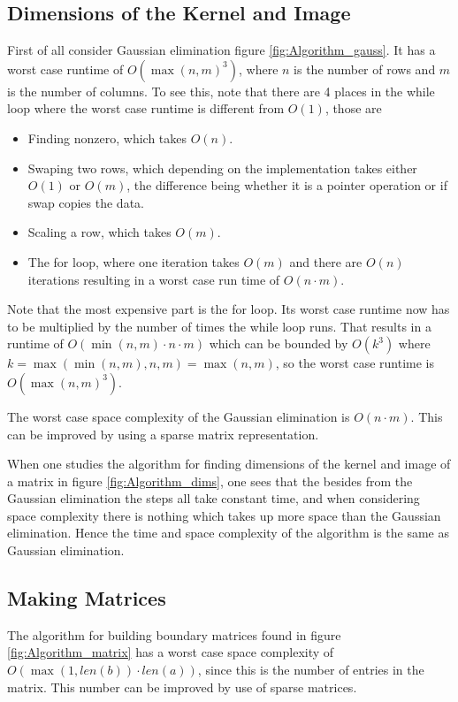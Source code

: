 \documentclass[11pt,a4paper,twoside]{report}
\begin{document}
\subsection{Dimensions of the Kernel and Image}
First of all consider Gaussian elimination figure \ref{fig:Algorithm_gauss}. It has a worst case runtime of $O(\max(n,m)^3)$, where $n$ is the number of rows and $m$ is the number of columns. To see this, note that there are 4 places in the while loop where the worst case runtime is different from $O(1)$, those are 
\begin{itemize}
\item Finding nonzero, which takes $O(n)$.
\item Swaping two rows, which depending on the implementation takes either $O(1)$ or $O(m)$, the difference being whether it is a pointer operation or if swap copies the data.
\item Scaling a row, which takes $O(m)$.
\item The for loop, where one iteration takes $O(m)$ and there are $O(n)$ iterations resulting in a worst case run time of $O(n\cdot m)$.
\end{itemize}
Note that the most expensive part is the for loop. Its worst case runtime now has to be multiplied by the number of times the while loop runs. That results in a runtime of $O(\min(n,m)\cdot n \cdot m)$ which can be bounded by $O(k^3)$ where $k = \max(\min(n,m), n, m)=\max(n,m)$, so the worst case runtime is $O(\max(n,m)^3)$.

The worst case space complexity of the Gaussian elimination is $O(n\cdot m)$. This can be improved by using a sparse matrix representation.

When one studies the algorithm for finding dimensions of the kernel and image of a matrix in figure \ref{fig:Algorithm_dims}, one sees that the besides from the Gaussian elimination the steps all take constant time, and when considering space complexity there is nothing which takes up more space than the Gaussian elimination. Hence the time and space complexity of the algorithm is the same as Gaussian elimination.

\subsection{Making Matrices}
The algorithm for building boundary matrices found in figure \ref{fig:Algorithm_matrix} has a worst case space complexity of $O(\max(1,len(b))\cdot len(a))$, since this is the number of entries in the matrix. This number can be improved by use of sparse matrices.
\end{document}
